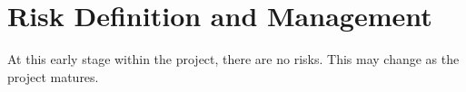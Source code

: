 \section{Risk Definition and Management} 

At this early stage within the project, there are no risks. This may change as the project matures.
